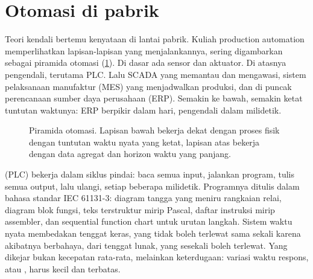 \section{Otomasi di pabrik}

Teori kendali bertemu kenyataan di lantai pabrik. Kuliah production automation memperlihatkan lapisan-lapisan
yang menjalankannya, sering digambarkan sebagai piramida otomasi (\cref{fig:piramida}). Di dasar ada sensor dan
aktuator. Di atasnya pengendali, terutama PLC. Lalu SCADA yang memantau dan mengawasi, sistem pelaksanaan
manufaktur (MES) yang menjadwalkan produksi, dan di puncak perencanaan sumber daya perusahaan (ERP). Semakin
ke bawah, semakin ketat tuntutan waktunya: ERP berpikir dalam hari, pengendali dalam milidetik.

\begin{figure}[ht]
\centering
{}
\caption{Piramida otomasi. Lapisan bawah bekerja dekat dengan proses fisik dengan tuntutan waktu nyata yang ketat,
lapisan atas bekerja dengan data agregat dan horizon waktu yang panjang.}
\label{fig:piramida}
\end{figure}

 (PLC) bekerja dalam siklus pindai: baca semua input, jalankan program, tulis
semua output, lalu ulangi, setiap beberapa milidetik. Programnya ditulis dalam bahasa standar IEC 61131-3: diagram
tangga yang meniru rangkaian relai, diagram blok fungsi, teks terstruktur mirip Pascal, daftar instruksi mirip
assembler, dan sequential function chart untuk urutan langkah. Sistem waktu nyata membedakan tenggat keras, yang
tidak boleh terlewat sama sekali karena akibatnya berbahaya, dari tenggat lunak, yang sesekali boleh terlewat.
Yang dikejar bukan kecepatan rata-rata, melainkan keterdugaan: variasi waktu respons, atau , harus
kecil dan terbatas.

